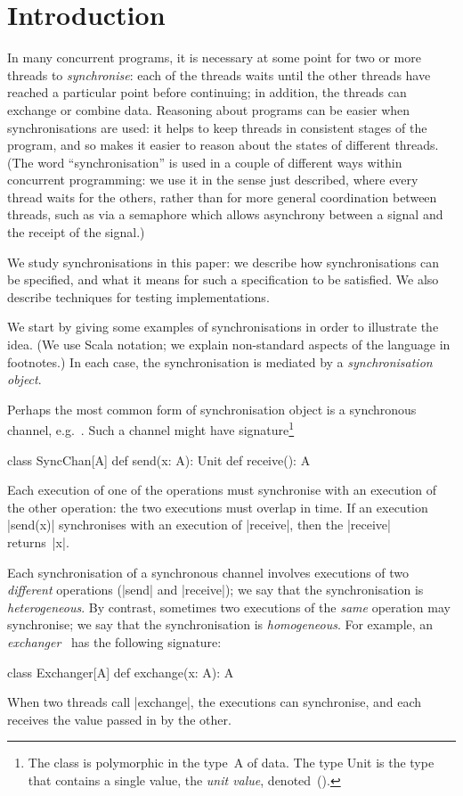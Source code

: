 
\section{Introduction}
\label{sec:intro}

In many concurrent programs, it is necessary at some point for two or more
threads to \emph{synchronise}: each of the threads waits until the other
threads have reached a particular point before continuing; in addition, the
threads can exchange or combine data.  Reasoning about programs can be easier
when synchronisations are used: it helps to keep threads in consistent stages
of the program, and so makes it easier to reason about the states of different
threads. (The word ``synchronisation'' is used in a couple of different ways
within concurrent programming: we use it in the sense just described, where
every thread waits for the others, rather than for more general coordination
between threads, such as via a semaphore which allows asynchrony between a
signal and the receipt of the signal.)

We study synchronisations in this paper: we describe how synchronisations can
be specified, and what it means for such a specification to be satisfied.  We
also describe techniques for testing implementations. 

We start by giving some examples of synchronisations in order to illustrate
the idea.  (We use Scala notation; we explain non-standard aspects of the
language in footnotes.)  In each case, the synchronisation is mediated by a
\emph{synchronisation object}.

Perhaps the most common form of synchronisation object is a synchronous
channel, e.g.~\cite{H78,occam,andrews,JCSP,sufrin:CSO,DK-go}.  Such a channel
might have signature\footnote{The class is polymorphic in the
  type~{\scalashape A} of data.  The type {\scalashape Unit} is the type that
  contains a single value, the \emph{unit value}, denoted~{\scalashape ()}.}
%
\begin{scala}
class SyncChan[A]{
  def send(x: A): Unit
  def receive(): A
}
\end{scala}
%
Each execution of one of the operations must synchronise with an execution
of the other operation: the two executions must overlap in time.  If an
execution |send(x)| synchronises with an execution of |receive|, then the
|receive| returns~|x|.

Each synchronisation of a synchronous channel involves executions of two
\emph{different} operations (|send| and |receive|); we say that the
synchronisation is \emph{heterogeneous}.  By contrast, sometimes two
executions of the \emph{same} operation may synchronise; we say that the
synchronisation is \emph{homogeneous}.  For example, an
\emph{exchanger}~\cite{HSY2004,herlihy-shavit} has the following signature:
%
\begin{scala}
class Exchanger[A]{
  def exchange(x: A): A
}
\end{scala}
%
When two threads call |exchange|, the executions can synchronise, and each
receives the value passed in by the other.

